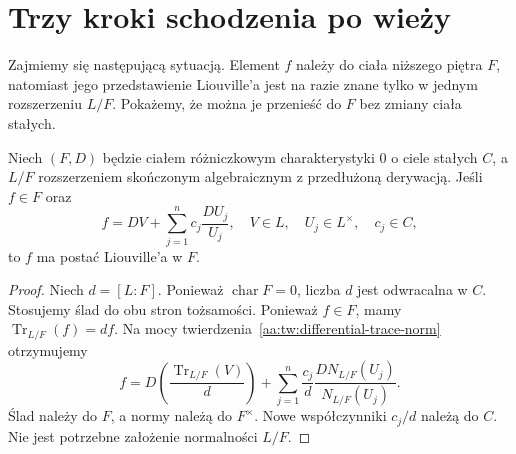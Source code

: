 \section{Trzy kroki schodzenia po wieży}

Zajmiemy się następującą sytuacją. Element $f$
należy do ciała niższego piętra $F$, natomiast
jego przedstawienie Liouville'a jest na razie znane
tylko w jednym rozszerzeniu $L/F$. Pokażemy, że
można je przenieść do $F$ bez zmiany ciała stałych.

\begin{lemat}
\label{aa:lem:liouville-algebraic-descent}
Niech $(F,D)$ będzie ciałem różniczkowym
charakterystyki $0$ o ciele stałych $C$, a
$L/F$ rozszerzeniem skończonym algebraicznym
z przedłużoną derywacją. Jeśli $f\in F$ oraz
\[
 f=DV+\sum_{j=1}^{n}c_j\frac{DU_j}{U_j},
 \quad V\in L,\quad U_j\in L^\times,\quad c_j\in C,
\]
to $f$ ma postać Liouville'a w $F$.
\end{lemat}
\begin{proof}
Niech $d=[L:F]$. Ponieważ $\operatorname{char}F=0$,
liczba $d$ jest odwracalna w $C$.
Stosujemy ślad do obu stron tożsamości.
Ponieważ $f\in F$, mamy
$\operatorname{Tr}_{L/F}(f)=df$.
Na mocy twierdzenia~\ref{aa:tw:differential-trace-norm}
otrzymujemy
\[
 f=D\left(\frac{\operatorname{Tr}_{L/F}(V)}d\right)
   +\sum_{j=1}^{n}\frac{c_j}{d}
       \frac{D N_{L/F}(U_j)}{N_{L/F}(U_j)}.
\]
Ślad należy do $F$, a normy należą do $F^\times$.
Nowe współczynniki $c_j/d$ należą do $C$.
Nie jest potrzebne założenie normalności $L/F$.
\end{proof}

